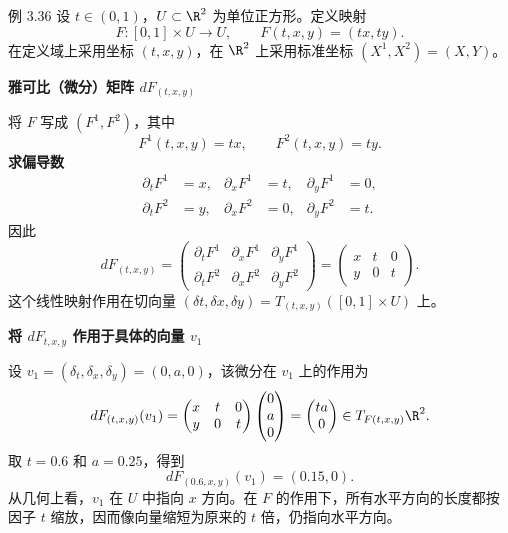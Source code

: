 \begin{statement}{例 3.36}{}
设 $t\in(0,1)$，$U\subset\R^2$ 为单位正方形。定义映射
\[
  F\colon[0,1]\times U\to U,\qquad F(t,x,y)=(tx,ty).
\]
在定义域上采用坐标 $(t,x,y)$，在 $\R^2$ 上采用标准坐标 $(X^1,X^2)=(X,Y)$。

\noindent\textbf{雅可比（微分）矩阵 $dF_{(t,x,y)}$}\par
将 $F$ 写成 $(F^1,F^2)$，其中
\[
  F^1(t,x,y)=tx,\qquad F^2(t,x,y)=ty.
\]
\noindent\textbf{求偏导数}
\begin{align*}
  \partial_tF^1&=x,&\partial_xF^1&=t,&\partial_yF^1&=0,\\
  \partial_tF^2&=y,&\partial_xF^2&=0,&\partial_yF^2&=t.
\end{align*}
因此
\[
  dF_{(t,x,y)}
  =\begin{pmatrix}\partial_tF^1&\partial_xF^1&\partial_yF^1\\
                   \partial_tF^2&\partial_xF^2&\partial_yF^2\end{pmatrix}
  =\begin{pmatrix}x&t&0\\y&0&t\end{pmatrix}.
\]
这个线性映射作用在切向量 $(\delta t,\delta x,\delta y)=T_{(t,x,y)}([0,1]\times U)$ 上。%

\noindent\textbf{将 $dF_{t,x,y}$ 作用于具体的向量 $v_1$}\par
设 $v_1=(\delta_t,\delta_x,\delta_y)=(0,a,0)$，该微分在 $v_1$ 上的作用为
\[
  dF_{(t,x,y)}(v_1)
  =\begin{pmatrix}x&t&0\\y&0&t\end{pmatrix}
   \begin{pmatrix}0\\a\\0\end{pmatrix}
  =\begin{pmatrix}ta\\0\end{pmatrix}\in T_{F(t,x,y)}\R^2.
\]
取 $t=0.6$ 和 $a=0.25$，得到
\[
  dF_{(0.6,x,y)}(v_1)=(0.15,0).
\]
从几何上看，$v_1$ 在 $U$ 中指向 $x$ 方向。在 $F$ 的作用下，所有水平方向的长度都按因子 $t$ 缩放，因而像向量缩短为原来的 $t$ 倍，仍指向水平方向。


\end{statement}
